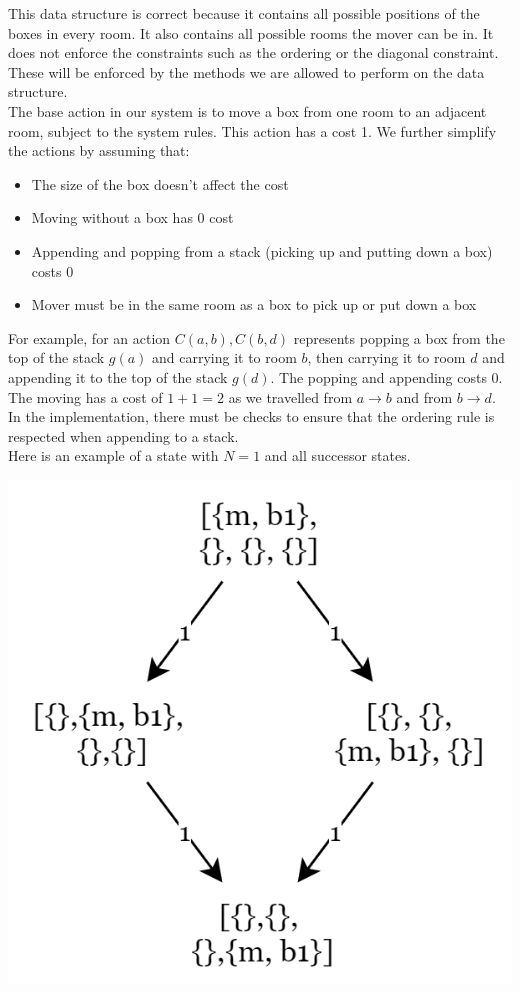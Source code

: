 \begin{enumerate}
        This data structure is correct because it contains all possible positions of the boxes in every room. It also contains all possible rooms the mover can be in. It does not enforce the constraints such as the ordering or the diagonal constraint. These will be enforced by the methods we are allowed to perform on the data structure.\\
        The base action in our system is to move a box from one room to an adjacent room, subject to the system rules. This action has a cost 1. We further simplify the actions by assuming that:
        \begin{itemize}
          \item The size of the box doesn't affect the cost
          \item Moving without a box has 0 cost
          \item Appending and popping from a stack (picking up and putting down a box) costs 0
          \item Mover must be in the same room as a box to pick up or put down a box
        \end{itemize}
        For example, for an action $C(a, b), C(b, d)$ represents popping a box from the top of the stack $g(a)$ and carrying it to room $b$, then carrying it to room $d$ and appending it to the top of the stack $g(d)$. The popping and appending costs 0. The moving has a cost of $1+1=2$ as we travelled from $a\rightarrow b$ and from $b\rightarrow d$. In the implementation, there must be checks to ensure that the ordering rule is respected when appending to a stack.\\
        Here is an example of a state with $N=1$ and all successor states.
        \begin{center}
          \includegraphics[scale=0.4]{"./Diagrams/Q2_StartStateWithAllSuccessorStates.png"}

\end{center}
\end{enumerate}
